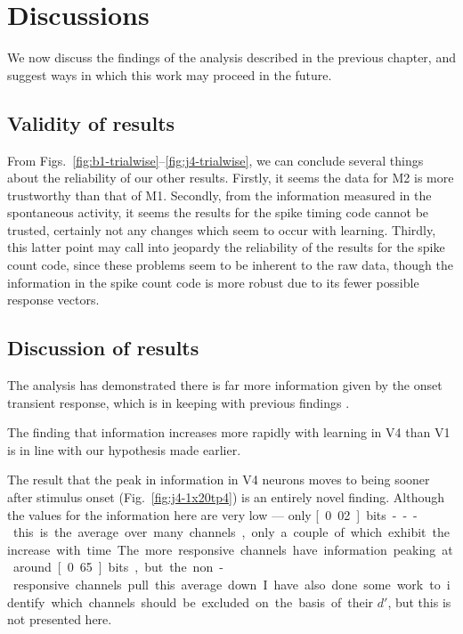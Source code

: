 \section{Discussions}

We now discuss the findings of the analysis described in the previous chapter, and suggest ways in which this work may proceed in the future.

\subsection{Validity of results}

From Figs.~\ref{fig:b1-trialwise}--\ref{fig:j4-trialwise}, we can conclude several things about the reliability of our other results.
Firstly, it seems the data for \ac{M2} is more trustworthy than that of \ac{M1}.
Secondly, from the information measured in the spontaneous activity, it seems the results for the spike timing code cannot be trusted, certainly not any changes which seem to occur with learning.
Thirdly, this latter point may call into jeopardy the reliability of the results for the spike count code, since these problems seem to be inherent to the raw data, though the information in the spike count code is more robust due to its fewer possible response vectors.

\subsection{Discussion of results}

The analysis has demonstrated there is far more information given by the onset transient response, which is in keeping with previous findings \cite{Muller2001}.

The finding that information increases more rapidly with learning in \ac{V4} than \ac{V1} is in line with our hypothesis made earlier.

The result that the peak in information in \ac{V4} neurons moves to being sooner after stimulus onset (Fig.~\ref{fig:j4-1x20tp4}) is an entirely novel finding.
Although the values for the information here are very low --- only \unit[0.02]{bits} --- this is the average over many channels, only a couple of which exhibit the increase with time.
The more responsive channels have information peaking at around \unit[0.65]{bits}, but the non-responsive channels pull this average down.
I have also done some work to identify which channels should be excluded on the basis of their $d'$, but this is not presented here.

